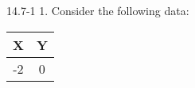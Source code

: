 \begin{exsol@exercise}{14.7-1}
1.	Consider the following data:

\begin{tabular}{@{} cc @{}} \hline
X & Y \\ \hline
-2 & 0 \\


\end{tabular}

\end{exsol@exercise}
